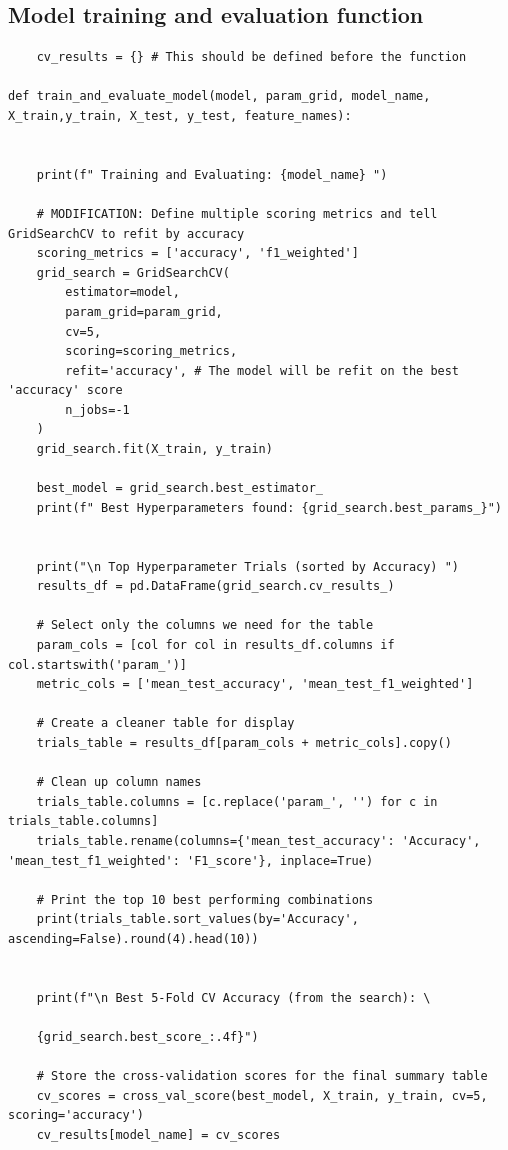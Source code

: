 \documentclass[12pt]{article}
\begin{document}
\subsection*{Model training and evaluation function}
\begin{verbatim}
    cv_results = {} # This should be defined before the function

def train_and_evaluate_model(model, param_grid, model_name, X_train,y_train, X_test, y_test, feature_names):


    print(f" Training and Evaluating: {model_name} ")

    # MODIFICATION: Define multiple scoring metrics and tell GridSearchCV to refit by accuracy
    scoring_metrics = ['accuracy', 'f1_weighted']
    grid_search = GridSearchCV(
        estimator=model,
        param_grid=param_grid,
        cv=5,
        scoring=scoring_metrics,
        refit='accuracy', # The model will be refit on the best 'accuracy' score
        n_jobs=-1
    )
    grid_search.fit(X_train, y_train)

    best_model = grid_search.best_estimator_
    print(f" Best Hyperparameters found: {grid_search.best_params_}")

    
    print("\n Top Hyperparameter Trials (sorted by Accuracy) ")
    results_df = pd.DataFrame(grid_search.cv_results_)
    
    # Select only the columns we need for the table
    param_cols = [col for col in results_df.columns if col.startswith('param_')]
    metric_cols = ['mean_test_accuracy', 'mean_test_f1_weighted']
    
    # Create a cleaner table for display
    trials_table = results_df[param_cols + metric_cols].copy()
    
    # Clean up column names
    trials_table.columns = [c.replace('param_', '') for c in trials_table.columns]
    trials_table.rename(columns={'mean_test_accuracy': 'Accuracy', 'mean_test_f1_weighted': 'F1_score'}, inplace=True)
    
    # Print the top 10 best performing combinations
    print(trials_table.sort_values(by='Accuracy', ascending=False).round(4).head(10))
   

    print(f"\n Best 5-Fold CV Accuracy (from the search): \
    
    {grid_search.best_score_:.4f}")
    
    # Store the cross-validation scores for the final summary table
    cv_scores = cross_val_score(best_model, X_train, y_train, cv=5, scoring='accuracy')
    cv_results[model_name] = cv_scores


\end{verbatim}
\end{document}

